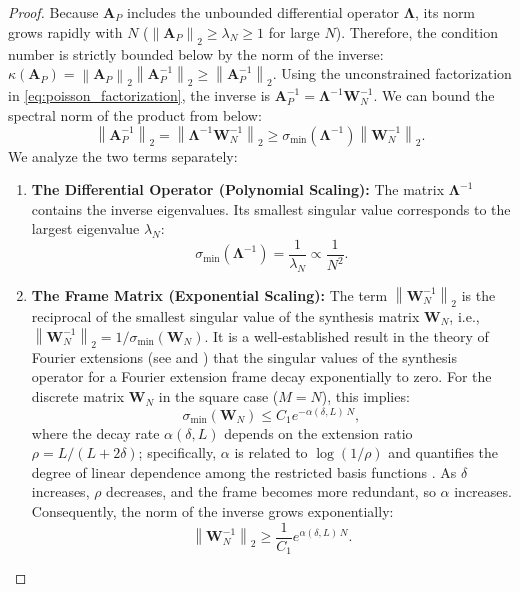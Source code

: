 \documentclass[pdflatex,sn-mathphys-num]{sn-jnl}%
\theoremstyle{thmstyleone}%
\newcommand{\norm}[1]{\left\lVert#1\right\rVert}
\newcommand{\mat}[1]{\mathbf{#1}}
\begin{document}
\begin{proof}
Because $\mat{A}_P$ includes the unbounded differential operator $\mathbf{\Lambda}$, its norm grows rapidly with $N$ ($\norm{\mat{A}_P}_2 \ge \lambda_N \ge 1$ for large $N$). Therefore, the condition number is strictly bounded below by the norm of the inverse: $\kappa(\mat{A}_P) = \norm{\mat{A}_P}_2 \norm{\mat{A}_P^{-1}}_2 \ge \norm{\mat{A}_P^{-1}}_2$. Using the unconstrained factorization in \eqref{eq:poisson_factorization}, the inverse is $\mat{A}_P^{-1} = \mathbf{\Lambda}^{-1} \mat{W}_N^{-1}$.
We can bound the spectral norm of the product from below:
\begin{equation}
\norm{\mat{A}_P^{-1}}_2 = \norm{\mathbf{\Lambda}^{-1} \mat{W}_N^{-1}}_2 \ge \sigma_{\min}(\mathbf{\Lambda}^{-1}) \norm{\mat{W}_N^{-1}}_2.
\end{equation}
We analyze the two terms separately:
\begin{enumerate}
    \item \textbf{The Differential Operator (Polynomial Scaling):} The matrix $\mathbf{\Lambda}^{-1}$ contains the inverse eigenvalues. Its smallest singular value corresponds to the largest eigenvalue $\lambda_N$:
    \begin{equation} \sigma_{\min}(\mathbf{\Lambda}^{-1}) = \frac{1}{\lambda_N} \propto \frac{1}{N^2}. \end{equation}
    
    \item \textbf{The Frame Matrix (Exponential Scaling):} The term $\norm{\mat{W}_N^{-1}}_2$ is the reciprocal of the smallest singular value of the synthesis matrix $\mat{W}_N$, i.e., $\norm{\mat{W}_N^{-1}}_2 = 1/\sigma_{\min}(\mat{W}_N)$.
    It is a well-established result in the theory of Fourier extensions (see \cite[Sec.~4]{adcock2014numerical} and \cite{huybrechs2010fourier}) that the singular values of the synthesis operator for a Fourier extension frame decay exponentially to zero. For the discrete matrix $\mat{W}_N$ in the square case ($M=N$), this implies:
    \begin{equation} \sigma_{\min}(\mat{W}_N) \le C_1 e^{-\alpha(\delta, L)\, N}, \end{equation}
    where the decay rate $\alpha(\delta, L)$ depends on the extension ratio $\rho = L/(L+2\delta)$; specifically, $\alpha$ is related to $\log(1/\rho)$ and quantifies the degree of linear dependence among the restricted basis functions \cite[Sec.~4]{adcock2014numerical}. As $\delta$ increases, $\rho$ decreases, and the frame becomes more redundant, so $\alpha$ increases. Consequently, the norm of the inverse grows exponentially:
    \begin{equation} \norm{\mat{W}_N^{-1}}_2 \ge \frac{1}{C_1} e^{\alpha(\delta, L)\, N}. \end{equation}
\end{enumerate}


\end{proof}
\end{document}

